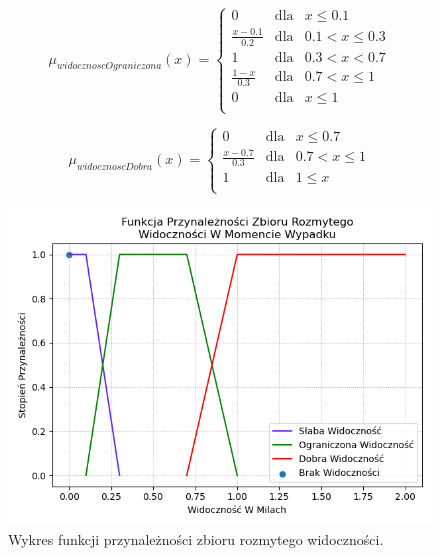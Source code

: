 \documentclass{classrep}
\begin{document}
\begin{equation}
\mu _{widocznoscOgraniczona}(x) =  \left\{ \begin{array}{rcl}
 0 & \mbox{dla} & x  \leq 0.1 \\
\frac{x - 0.1}{0.2} & \mbox{dla} & 0.1 < x \leq 0.3\\
1 & \mbox{dla} & 0.3 < x < 0.7\\
\frac{1 - x}{0.3} & \mbox{dla} & 0.7 < x \leq1\\
 0 & \mbox{dla} & x  \leq 1 \\
\end{array}\right.
\end{equation}

\begin{equation}
\mu _{widocznoscDobra}(x) =  \left\{ \begin{array}{rcl}
 0 & \mbox{dla} & x \leq 0.7 \\
\frac{x - 0.7}{0.3} & \mbox{dla} & 0.7 < x \leq 1\\
1 & \mbox{dla} & 1 \leq x\\
\end{array}\right.
\end{equation}

\begin{figure}[h!]
 \centering
 \includegraphics[width=14cm]{FunkcjaPrzynaleznosciWidocznosc.png}
 \vspace{-0.3cm}
 \caption{Wykres funkcji przynależności zbioru rozmytego widoczności. }
 \label{rysunek do eksperymentu 1 wariantu 1}
\end{figure}
\newpage
\end{document}
